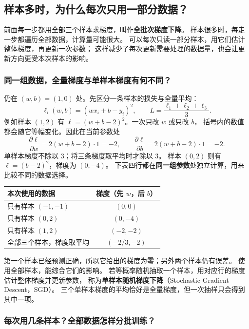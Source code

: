 \subsection{样本多时，为什么每次只用一部分数据？}
\label{intro:18c-training-engineering}

前面每一步都用全部三个样本求梯度，叫作\textbf{全批次梯度下降}。
样本很多时，每走一步都遍历全部数据，计算量可能很大。
可以每次只读一部分样本，用它们估计整体梯度，再更新一次参数；
这样减少了每次更新需要处理的数据量，也会让更新方向更受本次样本的影响。

\subsubsection{同一组数据，全量梯度与单样本梯度有何不同？}
\label{experiment:sample-gradient}

仍在 $(w,b)=(1,0)$ 处。先区分一条样本的损失与全量平均：
\[
\ell_i(w,b)=(wx_i+b-y_i)^2,\qquad L=\frac{\ell_1+\ell_2+\ell_3}{3}.
\]
例如样本 $(1,2)$ 有 $\ell=(w+b-2)^2$。一次只改 $w$ 或只改 $b$，
括号内的数值都会随它等幅变化。因此在当前参数处
\[
\frac{\partial\ell}{\partial w}=2(w+b-2)\cdot1=-2,\qquad
\frac{\partial\ell}{\partial b}=2(w+b-2)\cdot1=-2.
\]
单样本梯度不除以 $3$；将三条梯度取平均时才除以 $3$。
样本 $(0,2)$ 则有 $\ell=(b-2)^2$，梯度为 $(0,-4)$。
下表四行都在\textbf{同一组参数}处独立计算，用来比较不同的数据选择。
\begin{center}
\begin{tabular}{lc}
\toprule
本次使用的数据 & 梯度（先 $w$，后 $b$）\\\midrule
只有样本 $(-1,-1)$ & $(0,0)$\\
只有样本 $(0,2)$ & $(0,-4)$\\
只有样本 $(1,2)$ & $(-2,-2)$\\
全部三个样本，梯度取平均 & $(-2/3,-2)$\\
\bottomrule
\end{tabular}
\end{center}
第一个样本已经预测正确，所以它给出的梯度为零；另外两个样本仍有误差。
使用全部样本，能综合它们的影响。
若等概率随机抽取一个样本，用对应行的梯度估计整体梯度并更新参数，
称为\textbf{单样本随机梯度下降}（Stochastic Gradient Descent，SGD）。
三个单样本梯度的平均恰好是全量梯度，但一次抽样只会得到其中一项。

\subsubsection{每次用几条样本？全部数据怎样分批训练？}

